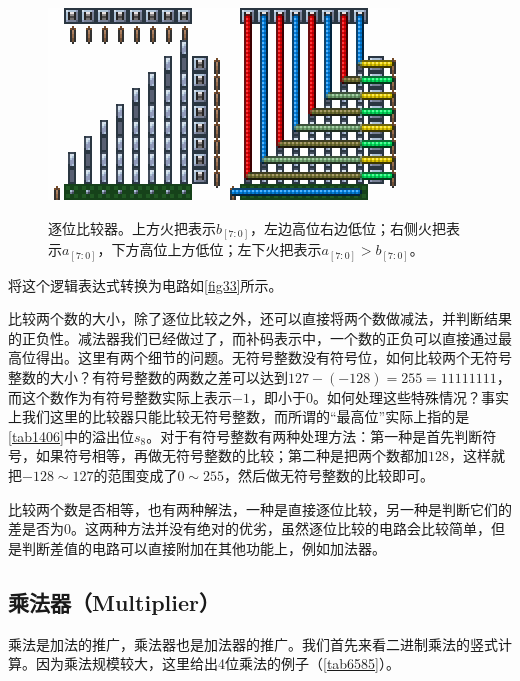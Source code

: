 \begin{figure}
\centering
\includegraphics{images/396.png}\qquad\includegraphics{images/397.png}
\caption{逐位比较器。上方火把表示$b_{[7:0]}$，左边高位右边低位；右侧火把表示$a_{[7:0]}$，下方高位上方低位；左下火把表示$a_{[7:0]}\mathtt{>}b_{[7:0]}$。}\label{fig33}
\end{figure}
将这个逻辑表达式转换为电路如\autoref{fig33}所示。

比较两个数的大小，除了逐位比较之外，还可以直接将两个数做减法，并判断结果的正负性。减法器我们已经做过了，而补码表示中，一个数的正负可以直接通过最高位得出。这里有两个细节的问题。无符号整数没有符号位，如何比较两个无符号整数的大小？有符号整数的两数之差可以达到$127-(-128)=255=11111111$，而这个数作为有符号整数实际上表示$-1$，即小于0。如何处理这些特殊情况？事实上我们这里的比较器只能比较无符号整数，而所谓的“最高位”实际上指的是\autoref{tab1406}中的溢出位$s_8$。对于有符号整数有两种处理方法：第一种是首先判断符号，如果符号相等，再做无符号整数的比较；第二种是把两个数都加$128$，这样就把$-128\sim127$的范围变成了$0\sim255$，然后做无符号整数的比较即可。

比较两个数是否相等，也有两种解法，一种是直接逐位比较，另一种是判断它们的差是否为0。这两种方法并没有绝对的优劣，虽然逐位比较的电路会比较简单，但是判断差值的电路可以直接附加在其他功能上，例如加法器。

\subsection{乘法器（Multiplier）}
乘法是加法的推广，乘法器也是加法器的推广。我们首先来看二进制乘法的竖式计算。因为乘法规模较大，这里给出4位乘法的例子（\autoref{tab6585}）。


